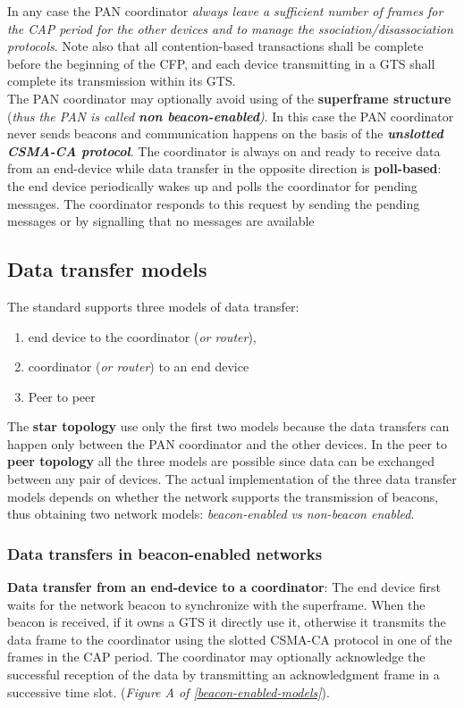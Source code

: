 \documentclass[10pt,a4paper]{report}
\theoremstyle{definition}
\begin{document}
In any case the PAN coordinator \textit{always leave a sufficient number of frames for the CAP period for the other devices and to manage the ssociation/disassociation protocols}. Note also that all contention-based transactions shall be complete before the beginning of the CFP, and each device transmitting in a GTS shall complete its transmission within its GTS.\\

The PAN coordinator may optionally avoid using of the \textbf{superframe structure} (\textit{thus the PAN is called \textbf{non beacon-enabled})}. In this case the PAN coordinator never sends beacons and communication happens on the basis of the \textit{\textbf{unslotted CSMA-CA protocol}}. The coordinator is always on and ready to receive data from an end-device while data transfer in the opposite direction is \textbf{poll-based}: the end device periodically wakes up and polls the coordinator for pending messages. The coordinator responds to this request by sending the pending messages or by signalling that no messages are available
\subsection{Data transfer models}\label{sec:data-transfer-models}
The standard supports three models of data transfer:
\begin{enumerate}
	\item 
	end device to the coordinator (\textit{or router}),
	\item 
	coordinator (\textit{or router}) to an end device
	\item 
	Peer to peer
\end{enumerate}

The \textbf{star topology} use only the first two models because the data transfers can happen only between the PAN coordinator and the other devices. In the peer to \textbf{peer topology} all the three models are possible since data can be exchanged between any pair of devices. The actual implementation of the three data transfer models depends on whether the network supports the transmission of beacons, thus obtaining two network models: \textit{beacon-enabled vs non-beacon enabled}.

\subsubsection{Data transfers in beacon-enabled networks}\label{sec:data-transfers-in-beacon-enabled-networks}
\textbf{Data transfer from an end-device to a coordinator}: The end device first waits for the network beacon to synchronize with the superframe. When the beacon is received, if it owns a GTS it directly use it, otherwise it transmits the data frame to the coordinator using the slotted CSMA-CA protocol in one of the frames in the CAP period. The coordinator may optionally acknowledge the successful reception of the data by transmitting an acknowledgment frame in a successive time slot. (\textit{Figure A of \ref{beacon-enabled-models}}).
\end{document}

